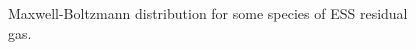 % 	
\begin{figure}[!ht]
	\centering
	
	\caption[Maxwell-Boltzmann distribution for some species of ESS residual gas]{Maxwell-Boltzmann distribution for some species of ESS residual gas.}
	\label{chap3:maxwell_gas}
\end{figure}